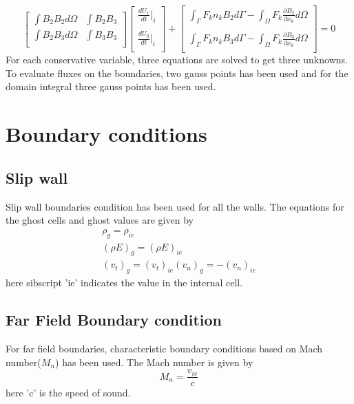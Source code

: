 \documentclass[12pt]{elsarticle}
\begin{document}
	$$
	\begin{bmatrix}
		\int B_2 B_2 d \Omega & \int B_2 B_3\\
		\int B_2 B_3 d \Omega & \int B_3 B_3\\
	\end{bmatrix}
	\begin{bmatrix}
		\frac{d U_x}{dt}|_i\\
		\\
		\frac{dU_y}{dt}|_i\\
	\end{bmatrix}
	+
	\begin{bmatrix}
		\int_{\Gamma} F_k n_k B_2 d\Gamma -\int_{\Omega} F_k \frac{\partial B_2}{\partial x_k} d\Omega\\
		\\
		\int_{\Gamma} F_k n_k B_3 d\Gamma -\int_{\Omega} F_k \frac{\partial B_3}{\partial x_k} d\Omega\\
	\end{bmatrix}=0
	$$
	For each conservative variable, three equations are solved to get three unknowns. To evaluate fluxes on the boundaries, two gauss points has been used and for the domain integral three gauss points has been used.
	
	\section{Boundary conditions}
	\subsection{Slip wall}
	Slip wall boundaries condition has been used for all the walls. The equations for the ghost cells and ghost values are given by
	\begin{equation}
		\begin{gathered}
			\rho_g=\rho_{ie}\\
			(\rho E)_g=(\rho E)_{ie}\\
			(v_t)_g=(v_t)_{ie}
			(v_n)_g=-(v_n)_{ie}
		\end{gathered}
	\end{equation}
	here sibscript 'ie' indicates the value in the internal cell.
	
	\subsection{Far Field Boundary condition}
	For far field boundaries, characteristic boundary conditions based on Mach number($M_n$) has been used. The Mach number is given by
	\begin{equation}
		M_n=\frac{v_{ie}}{c}
	\end{equation}
	here 'c' is the speed of sound.
\end{document}
